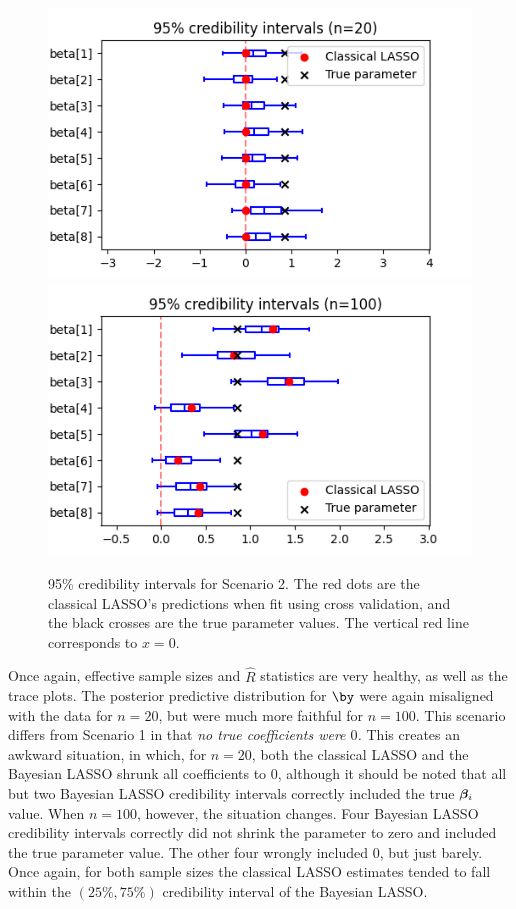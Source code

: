 \documentclass[a4paper, 10pt]{article}
\begin{document}
\begin{figure}[htb]
    \begin{center}
        \includegraphics[width=.6\textwidth]{../outputs/artificial_scenarios_n=20/scenario_2/credibility_intervals.png}
        \vspace{1cm}
        \includegraphics[width=.6\textwidth]{../outputs/artificial_scenarios_n=100/scenario_2/credibility_intervals.png}
    \end{center}
    \caption[95\% credibility intervals for Scenario 2.]{95\% credibility intervals for Scenario 2. The red dots are the classical LASSO's predictions when fit using cross validation, and the black crosses are the true parameter values. The vertical red line corresponds to $ x = 0 $.}
    \label{fig: credibility intervals scenario 2}
\end{figure}
Once again, effective sample sizes and $ \hat{ R } $ statistics are very healthy, as well as the trace plots.
The posterior predictive distribution for $ \by $ were again misaligned with the data for $ n = 20 $, but were much more faithful for $ n = 100 $.
This scenario differs from Scenario 1 in that \emph{no true coefficients were $ 0 $.}
This creates an awkward situation, in which, for $ n = 20 $, both the classical LASSO and the Bayesian LASSO shrunk all coefficients to $ 0 $, although it should be noted that all but two Bayesian LASSO credibility intervals correctly included the true $ \boldsymbol{\beta}_{ i } $ value.
When $ n = 100 $, however, the situation changes.
Four Bayesian LASSO credibility intervals correctly did not shrink the parameter to zero and included the true parameter value.
The other four wrongly included $ 0 $, but just barely.
Once again, for both sample sizes the classical LASSO estimates tended to fall within the $ (25\%, 75\%) $ credibility interval of the Bayesian LASSO.
\end{document}
